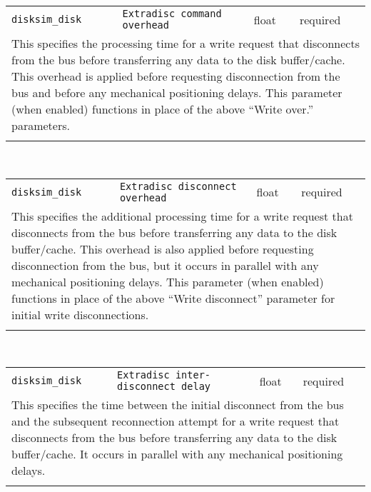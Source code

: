 \noindent 
\begin{tabular}{|p{\lpmodwidth}|p{\lpnamewidth}|p{0.5in}|p{0.5in}|}
\cline{1-4}
\texttt{disksim\_disk} & \texttt{Extradisc command overhead} & float & required \\ 
\cline{1-4}
\multicolumn{4}{|p{6in}|}{
This specifies the processing time for a write request that disconnects
from the bus before transferring any data to the disk buffer/cache.
This overhead is applied before requesting disconnection from the bus
and before any mechanical positioning delays. This parameter (when
enabled) functions in place of the above ``Write over.'' parameters.
}\\ 
\cline{1-4}
\multicolumn{4}{p{5in}}{}\\
\end{tabular}\\ 
\noindent 
\begin{tabular}{|p{\lpmodwidth}|p{\lpnamewidth}|p{0.5in}|p{0.5in}|}
\cline{1-4}
\texttt{disksim\_disk} & \texttt{Extradisc disconnect overhead} & float & required \\ 
\cline{1-4}
\multicolumn{4}{|p{6in}|}{
This specifies the additional processing time for a write request that
disconnects from the bus before transferring any data to the disk
buffer/cache. This overhead is also applied before requesting
disconnection from the bus, but it occurs in parallel with any
mechanical positioning delays. This parameter (when enabled)
functions in place of the above ``Write disconnect'' parameter for
initial write disconnections.
}\\ 
\cline{1-4}
\multicolumn{4}{p{5in}}{}\\
\end{tabular}\\ 
\noindent 
\begin{tabular}{|p{\lpmodwidth}|p{\lpnamewidth}|p{0.5in}|p{0.5in}|}
\cline{1-4}
\texttt{disksim\_disk} & \texttt{Extradisc inter-disconnect delay} & float & required \\ 
\cline{1-4}
\multicolumn{4}{|p{6in}|}{
This specifies the time between the initial disconnect from the bus and
the subsequent reconnection attempt for a write request that
disconnects from the bus before transferring any data to the disk
buffer/cache. It occurs in parallel with any mechanical positioning
delays.
}\\ 
\cline{1-4}
\multicolumn{4}{p{5in}}{}\\
\end{tabular}\\ 
\noindent 
